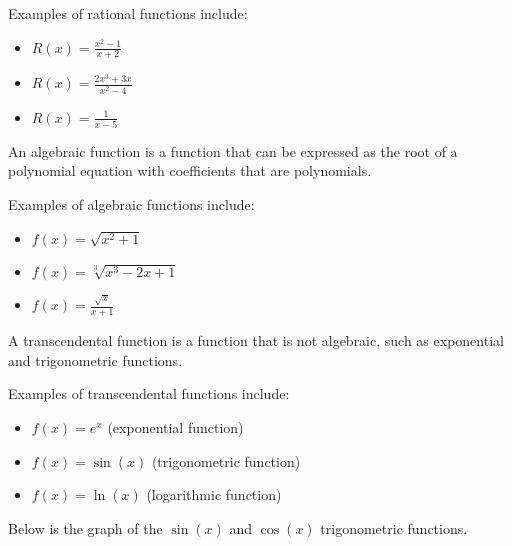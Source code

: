 \begin{eg}
    Examples of rational functions include:
    \begin{itemize}[itemsep=1pt,label=$\circ$]
        \item $R(x) = \frac{x^2 - 1}{x + 2}$
        \item $R(x) = \frac{2x^3 + 3x}{x^2 - 4}$
        \item $R(x) = \frac{1}{x - 5}$
    \end{itemize}
\end{eg}

\begin{definition}
    An algebraic function is a function that can be expressed as the root of a polynomial equation with coefficients that are polynomials.
\end{definition}

\begin{eg}
    Examples of algebraic functions include:
    \begin{itemize}[itemsep=1pt,label=$\circ$]
        \item $f(x) = \sqrt{x^2 + 1}$
        \item $f(x) = \sqrt[3]{x^3 - 2x + 1}$
        \item $f(x) = \frac{\sqrt{x}}{x + 1}$
    \end{itemize}
\end{eg}

\begin{definition}
    A transcendental function is a function that is not algebraic, such as exponential and trigonometric functions.
\end{definition}

\begin{eg}
    Examples of transcendental functions include:
    \begin{itemize}[itemsep=1pt,label=$\circ$]
        \item $f(x) = e^x$ (exponential function)
        \item $f(x) = \sin(x)$ (trigonometric function)
        \item $f(x) = \ln(x)$ (logarithmic function)
    \end{itemize}

    Below is the graph of the $\sin(x)$ and $\cos(x)$ trigonometric functions.
    \begin{center}
    \end{center}
\end{eg}

